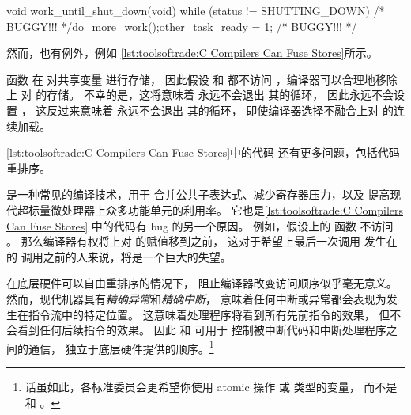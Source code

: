 \begin{description}[labelsep=.4em]
\begin{listing}
\begin{fcvlabel}
\begin{VerbatimLL}[commandchars=\\\[\]]
void work_until_shut_down(void)
{
	while (status != SHUTTING_DOWN) /* BUGGY!!! */
		do_more_work();
	other_task_ready = 1; /* BUGGY!!! */
}
\end{VerbatimLL}
\end{fcvlabel}
\caption{C 编译器可以融合存储}
\label{lst:toolsoftrade:C Compilers Can Fuse Stores}
\end{listing}

然而，也有例外，例如
\cref{lst:toolsoftrade:C Compilers Can Fuse Stores}所示。
\begin{fcvref}
函数  在
对共享变量  进行存储，
因此假设  和 
都不访问 ，编译器可以合理地移除上
对  的存储。
不幸的是，这将意味着  永远不会退出
其的循环，
因此永远不会设置 ，
这反过来意味着  永远不会退出
其的循环，
即使编译器选择不融合上对
 的连续加载。

\cref{lst:toolsoftrade:C Compilers Can Fuse Stores}中的代码
还有更多问题，包括代码重排序。

\item[代码重排序（Code reordering）] 是一种常见的编译技术，用于
合并公共子表达式、减少寄存器压力，以及
提高现代超标量微处理器上众多功能单元的利用率。
它也是\cref{lst:toolsoftrade:C Compilers Can Fuse Stores}
中的代码有 bug 的另一个原因。
例如，假设上的  函数
不访问 。
那么编译器有权将上对 
的赋值移到之前，
这对于希望上最后一次调用
 发生在的
 调用之前的人来说，将是一个巨大的失望。
\end{fcvref}

在底层硬件可以自由重排序的情况下，
阻止编译器改变访问顺序似乎毫无意义。
然而，现代机器具有\emph{精确异常}和\emph{精确中断}，
意味着任何中断或异常都会表现为发生在指令流中的特定位置。
这意味着处理程序将看到所有先前指令的效果，
但不会看到任何后续指令的效果。
因此  和  可用于
控制被中断代码和中断处理程序之间的通信，
独立于底层硬件提供的顺序。\footnote{
	话虽如此，各标准委员会更希望你使用 atomic 操作
	或  类型的变量，
	而不是  和 。}


\end{description}
